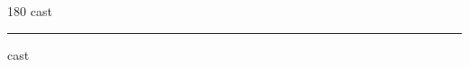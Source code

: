 
\begin{frame}
\begin{center}
\begin{turn}{180}
{\fontsize{2.5cm}{1em}\selectfont cast}
\end{turn}
\vspace{1em}\par  
\hrule
\vspace{1em}\par  
{\fontsize{2.5cm}{1em}\selectfont cast}
\end{center}
\end{frame}
